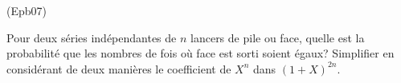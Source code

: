 \begin{tiny}(Epb07)\end{tiny} Pour deux séries indépendantes de $n$ lancers de pile ou face, quelle est la probabilité que les nombres de fois où face est sorti soient égaux?\newline
Simplifier en considérant de deux manières le coefficient de $X^n$ dans $(1+X)^{2n}$.
